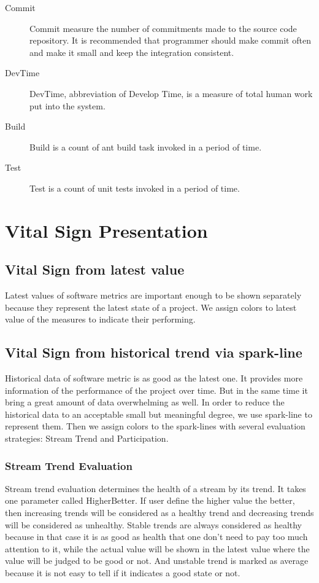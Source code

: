 \begin{description}
\item[Commit] 
Commit measure the number of commitments made to the source code repository. It is recommended that programmer should make commit often and make it small and keep the integration consistent.
\item[DevTime] 
DevTime, abbreviation of Develop Time, is a measure of total human work put into the system.
\item[Build] 
Build is a count of ant build task invoked in a period of time.
\item[Test] 
Test is a count of unit tests invoked in a period of time.
\end{description}

\section{Vital Sign Presentation}
\subsection{Vital Sign from latest value}
Latest values of software metrics are important enough to be shown separately because they represent the latest state of a project. We assign colors to latest value of the measures to indicate their performing.

\subsection{Vital Sign from historical trend via spark-line}
Historical data of software metric is as good as the latest one. It provides more information of the performance of the project over time. But in the same time it bring a great amount of data overwhelming as well. In order to reduce the historical data to an acceptable small but meaningful degree, we use spark-line to represent them. Then we assign colors to the spark-lines with several evaluation strategies: Stream Trend and Participation.

\subsubsection{Stream Trend Evaluation}
Stream trend evaluation determines the health of a stream by its trend. It takes one parameter called HigherBetter. If user define the higher value the better, then increasing trends will be considered as a healthy trend and decreasing trends will be considered as unhealthy. Stable trends are always considered as healthy because in that case it is as good as health that one don't need to pay too much attention to it, while the actual value will be shown in the latest value where the value will be judged to be good or not. And unstable trend is marked as average because it is not easy to tell if it indicates a good state or not. 

